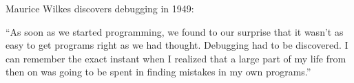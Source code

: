 \documentclass[aspectratio=169,usenames,dvipsnames]{beamer}
\begin{document}
\begin{frame}




    Maurice Wilkes discovers debugging in 1949:

    ``As soon as we started programming, we found to our surprise that it
    wasn't as easy to get programs right as we had thought. Debugging had to be
    discovered. I can remember the exact instant when I realized that a large
    part of my life from then on was going to be spent in finding mistakes in
    my own programs.''
    
\end{frame}
\end{document}
